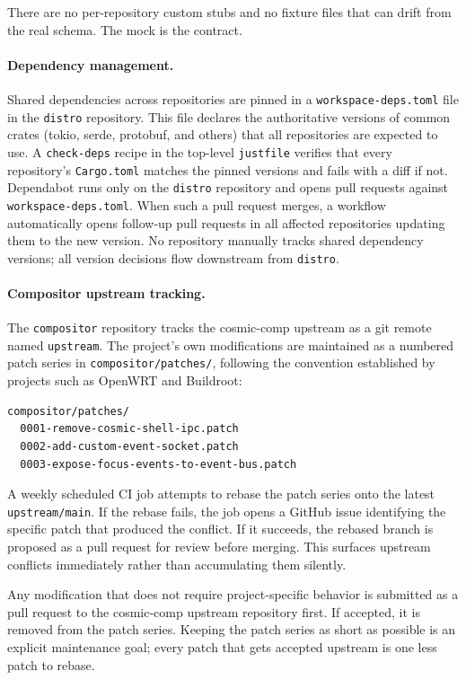 There are no per-repository custom stubs and no fixture files that can drift
from the real schema. The mock is the contract.

\paragraph{Dependency management.}
Shared dependencies across repositories are pinned in a
\texttt{workspace-deps.toml} file in the \texttt{distro} repository. This
file declares the authoritative versions of common crates (tokio, serde,
protobuf, and others) that all repositories are expected to use. A
\texttt{check-deps} recipe in the top-level \texttt{justfile} verifies that
every repository's \texttt{Cargo.toml} matches the pinned versions and fails
with a diff if not. Dependabot runs only on the \texttt{distro} repository
and opens pull requests against \texttt{workspace-deps.toml}. When such a
pull request merges, a workflow automatically opens follow-up pull requests in
all affected repositories updating them to the new version. No repository
manually tracks shared dependency versions; all version decisions flow
downstream from \texttt{distro}.

\paragraph{Compositor upstream tracking.}
The \texttt{compositor} repository tracks the cosmic-comp upstream as a git
remote named \texttt{upstream}. The project's own modifications are maintained
as a numbered patch series in \texttt{compositor/patches/}, following the
convention established by projects such as OpenWRT and Buildroot:

\begin{lstlisting}[language=bash, caption={Compositor patch series structure}]
compositor/patches/
  0001-remove-cosmic-shell-ipc.patch
  0002-add-custom-event-socket.patch
  0003-expose-focus-events-to-event-bus.patch
\end{lstlisting}

A weekly scheduled CI job attempts to rebase the patch series onto the latest
\texttt{upstream/main}. If the rebase fails, the job opens a GitHub issue
identifying the specific patch that produced the conflict. If it succeeds, the
rebased branch is proposed as a pull request for review before merging. This
surfaces upstream conflicts immediately rather than accumulating them silently.

Any modification that does not require project-specific behavior is submitted
as a pull request to the cosmic-comp upstream repository first. If accepted,
it is removed from the patch series. Keeping the patch series as short as
possible is an explicit maintenance goal; every patch that gets accepted
upstream is one less patch to rebase.

